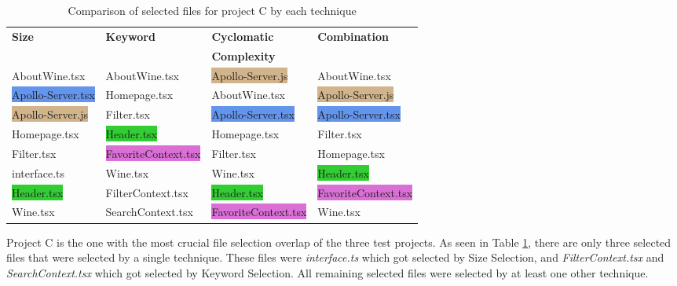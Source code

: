 \begin{table}[H]
  \centering
  \fontsize{10}{10}\selectfont
  \caption{Comparison of selected files for project C by each technique}
  \label{tab:Selected_files_C}
  \begin{tabularx}{\textwidth}{llll}
    \hline
     \textbf{Size} & \textbf{Keyword} & \textbf{Cyclomatic } & \textbf{Combination} \\
     \textbf{} & \textbf{} & \textbf{Complexity } & \textbf{} \\ [1ex] \hline \hline 
    \colorbox{BurntOrange}{AboutWine.tsx} & \colorbox{BurntOrange}{AboutWine.tsx} & \colorbox{Tan}{Apollo-Server.js} & \colorbox{BurntOrange}{AboutWine.tsx} \\ [2ex]
    \colorbox{CornflowerBlue}{Apollo-Server.tsx} & \colorbox{Rhodamine}{Homepage.tsx} & \colorbox{BurntOrange}{AboutWine.tsx} & \colorbox{Tan}{Apollo-Server.js} \\ [2ex]
    \colorbox{Tan}{Apollo-Server.js} & \colorbox{PineGreen}{Filter.tsx} & \colorbox{CornflowerBlue}{Apollo-Server.tsx} & \colorbox{CornflowerBlue}{Apollo-Server.tsx} \\ [2ex]
    \colorbox{Rhodamine}{Homepage.tsx} & \colorbox{LimeGreen}{Header.tsx} & \colorbox{Rhodamine}{Homepage.tsx} & \colorbox{PineGreen}{Filter.tsx} \\ [2ex] 
    \colorbox{PineGreen}{Filter.tsx} & \colorbox{Orchid}{FavoriteContext.tsx} & \colorbox{PineGreen}{Filter.tsx} & \colorbox{Rhodamine}{Homepage.tsx} \\ [2ex] 
    interface.ts & \colorbox{Mulberry}{Wine.tsx} & \colorbox{Mulberry}{Wine.tsx} & \colorbox{LimeGreen}{Header.tsx} \\ [2ex] 
    \colorbox{LimeGreen}{Header.tsx} & FilterContext.tsx & \colorbox{LimeGreen}{Header.tsx} & \colorbox{Orchid}{FavoriteContext.tsx} \\ [2ex]
    \colorbox{Mulberry}{Wine.tsx} & SearchContext.tsx & \colorbox{Orchid}{FavoriteContext.tsx} & \colorbox{Mulberry}{Wine.tsx} \\ [2ex] 

  \end{tabularx}
\end{table}

Project C is the one with the most crucial file selection overlap of the three test projects. As seen in Table \ref{tab:Selected_files_C}, there are only three selected files that were selected by a single technique. These files were \textit{interface.ts} which got selected by Size Selection, and \textit{FilterContext.tsx} and \textit{SearchContext.tsx} which got selected by Keyword Selection. All remaining selected files were selected by at least one other technique. \\

